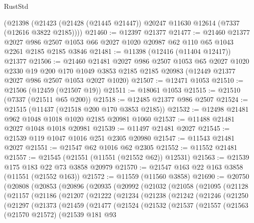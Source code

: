 \begin{lexlean}{RustStd}
\begin{coremodule}
    (@21398 (@21423 (@21428 (@21445 @21447)) @20247 @11630 @12614 (@7337 (@12616 @3822 @2185))))
@21460 := @12397 @21377
@21477 := @21460
    @21377
    @2027
    @986
    @2507
    @1053
    @66
    @2027
    @1020
    @20987
    @62
    @110
    @65
    @1043
    @2261
    @2185
    @2185
    @3846
@21481 := @11398 (@12416 (@11404 @12417)) @21377
@21506 := @21460
    @21481
    @2027
    @986
    @2507
    @1053
    @65
    @2027
    @1020
    @2330
    @19
    @200
    @170
    @1049
    @3853
    @2185
    @2185
    @20983
    (@12449 @21377 @2027 @986 @2507 @1053 @2027 @1020)
@21507 := @12471 @1053
@21510 := @21506 (@12459 (@21507 @19))
@21511 := @18061 @1053
@21515 := @21510 (@7337 (@21511 @65 @200))
@21518 := @12485 @21377 @986 @2507
@21524 := @21515 (@11437 (@21518 @200 @170 @3853 @2185))
@21532 := @12498 @21481 @962 @1048 @1018 @1020 @2185 @20981 @1060
@21537 := @11488 @21481 @2027 @1048 @1018 @20981
@21539 := @11497 @21481 @2027
@21545 := @21539 @119 @1047 @1016 @251 @2305 @20980
@21547 := @11543 @21481 @2027
@21551 := @21547 @62 @1016 @62 @2305
@21552 := @11552 @21481
@21557 := @21545 (@21551 (@11551 (@21552 @62)) @12531)
@21563 := @21539 @175 @183 @22 @73 @3858 @20979
@21570 := @21547 @163 @22 @163 @3858 (@11551 (@21552 @163))
@21572 := @11559 (@11560 @3858)
@21690 := @20750
    (@20808
      (@20853
        (@20896
          (@20935
            (@20992
              (@21032
                (@21058
                  (@21095
                    (@21128
                      (@21157
                        (@21186
                          (@21207
                            (@21222
                              (@21234
                                (@21238
                                  (@21242
                                    (@21246
                                      (@21250
                                        (@21297
                                          (@21373
                                            (@21459
                                              (@21477
                                                (@21524
                                                  (@21532
                                                    (@21537
                                                      (@21557
                                                        (@21563
                                                          (@21570 @21572)
                                                          (@21539
                                                            @181
                                                            @93

\end{coremodule}
\end{lexlean}

